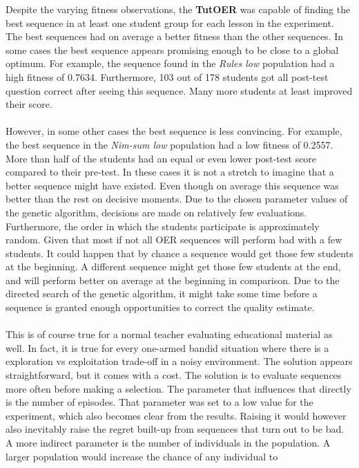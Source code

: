 \noindent
Despite the varying fitness observations, the \textbf{TutOER} was capable of
finding the best sequence in at least one student group for each lesson in the
experiment. The best sequences had on average a better fitness than the other
sequences. In some cases the best sequence appears promising enough to be close
to a global optimum. For example, the sequence found in the \emph{Rules low}
population had a high fitness of 0.7634. Furthermore, 103 out of 178 students
got all post-test question correct after seeing this sequence. Many more
students at least improved their score.\\\\
\noindent
However, in some other cases the best sequence is less convincing. For example,
the best sequence in the \emph{Nim-sum low} population had a low fitness of
0.2557. More than half of the students had an equal or even lower post-test
score compared to their pre-test. In these cases it is not a stretch to imagine
that a better sequence might have existed. Even though on average this sequence
was better than the rest on decisive moments. Due to the chosen parameter
values of the genetic algorithm, decisions are made on relatively few
evaluations. Furthermore, the order in which the students participate is
approximately random. Given that most if not all OER sequences will perform bad
with a few students. It could happen that by chance a sequence would get those
few students at the beginning. A different sequence might get those few
students at the end, and will perform better on average at the beginning in
comparison. Due to the directed search of the genetic algorithm, it might take
some time before a sequence is granted enough opportunities to correct the
quality estimate.\\\\
\noindent
This is of course true for a normal teacher evaluating educational material as
well. In fact, it is true for every one-armed bandid situation where there is a
exploration vs exploitation trade-off in a noisy environment. The solution
appears straightforward, but it comes with a cost. The solution is to evaluate
sequences more often before making a selection. The parameter that influences
that directly is the number of episodes. That parameter was set to a low value
for the experiment, which also becomes clear from the results. Raising it would
however also inevitably raise the regret built-up from sequences that turn out
to be bad. A more indirect parameter is the number of individuals in the
population. A larger population would increase the chance of any individual to
